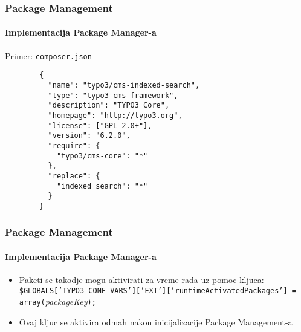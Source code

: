 
\begin{frame}[fragile]
	\frametitle{Package Management}
	\framesubtitle{Implementacija Package Manager-a}

	Primer: \texttt{composer.json}

	\lstset{
		basicstyle=\tiny\ttfamily
	}

	\begin{lstlisting}
		{
		  "name": "typo3/cms-indexed-search",
		  "type": "typo3-cms-framework",
		  "description": "TYPO3 Core",
		  "homepage": "http://typo3.org",
		  "license": ["GPL-2.0+"],
		  "version": "6.2.0",
		  "require": {
		    "typo3/cms-core": "*"
		  },
		  "replace": {
		    "indexed_search": "*"
		  }
		}
	\end{lstlisting}

\end{frame}


\begin{frame}[fragile]
	\frametitle{Package Management}
	\framesubtitle{Implementacija Package Manager-a}

	\lstset{
		basicstyle=\smaller\ttfamily
	}

	\begin{itemize}
		\item Paketi se takodje mogu aktivirati za vreme rada uz pomoc kljuca:
			\smaller\texttt{\$GLOBALS['TYPO3\_CONF\_VARS']['EXT']['runtimeActivatedPackages'] = array(}\space\textit{packageKey}\space\texttt{);}\normalsize

		\item Ovaj kljuc se aktivira odmah nakon inicijalizacije Package Management-a

	\end{itemize}

\end{frame}


